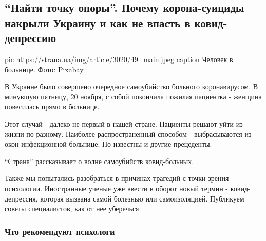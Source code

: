  
 
 
 
 

\subsection{\enquote{Найти точку опоры}. Почему корона-суициды накрыли Украину и как не впасть в ковид-депрессию}

\ifcmt
pic https://strana.ua/img/article/3020/49_main.jpeg
caption Человек в больнице. Фото: Pixabay 
\fi

 
В Украине было совершено очередное самоубийство больного коронавирусом. В
минувшую пятницу, 20 ноября, с собой покончила пожилая пациентка - женщина
повесилась прямо в больнице.

Этот случай - далеко не первый в нашей стране. Пациенты решают уйти из жизни
по-разному. Наиболее распространенный способом - выбрасываются из окон
инфекционной больнице. Но известны и другие прецеденты.

\enquote{Страна} рассказывает о волне самоубийств ковид-больных.

Также мы попытались разобраться в причинах трагедий с точки зрения
психологии. Иностранные ученые уже ввести в оборот новый термин -
ковид-депрессия, которая вызвана самой болезнью или самоизоляцией.
Публикуем советы специалистов, как от нее уберечься. 


\subsubsection{Что рекомендуют психологи}

